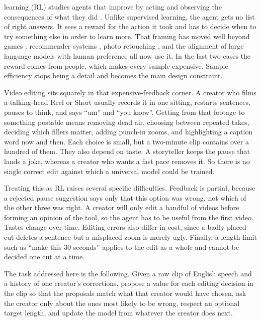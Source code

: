 \documentclass{ieeeaccess}
\begin{document}
\titlepgskip=-15pt

\maketitle

 learning (RL) studies agents that improve by acting and observing the consequences of what they did \cite{sutton2018}. Unlike supervised learning, the agent gets no list of right answers. It sees a reward for the action it took and has to decide when to try something else in order to learn more. That framing has moved well beyond games \cite{mnih2015}: recommender systems \cite{li2010,zheng2018,chen2019}, photo retouching \cite{hu2018exposure}, and the alignment of large language models with human preference \cite{christiano2017,ouyang2022} all now use it. In the last two cases the reward comes from people, which makes every sample expensive. Sample efficiency stops being a detail and becomes the main design constraint.

Video editing sits squarely in that expensive-feedback corner. A creator who films a talking-head Reel or Short usually records it in one sitting, restarts sentences, pauses to think, and says ``um'' and ``you know''. Getting from that footage to something postable means removing dead air, choosing between repeated takes, deciding which fillers matter, adding punch-in zooms, and highlighting a caption word now and then. Each choice is small, but a two-minute clip contains over a hundred of them. They also depend on taste. A storyteller keeps the pause that lands a joke, whereas a creator who wants a fast pace removes it. So there is no single correct edit against which a universal model could be trained.

Treating this as RL raises several specific difficulties. Feedback is partial, because a rejected pause suggestion says only that this option was wrong, not which of the other three was right. A creator will only edit a handful of videos before forming an opinion of the tool, so the agent has to be useful from the first video. Tastes change over time. Editing errors also differ in cost, since a badly placed cut deletes a sentence but a misplaced zoom is merely ugly. Finally, a length limit such as ``make this 30 seconds'' applies to the edit as a whole and cannot be decided one cut at a time.

The task addressed here is the following. Given a raw clip of English speech and a history of one creator's corrections, propose a value for each editing decision in the clip so that the proposals match what that creator would have chosen, ask the creator only about the ones most likely to be wrong, respect an optional target length, and update the model from whatever the creator does next.
\end{document}
